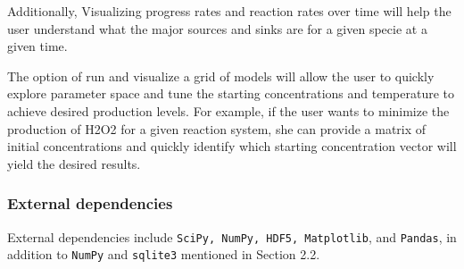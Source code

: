 \documentclass[12pt]{article}
\begin{document}
Additionally, Visualizing progress rates and reaction rates over time will help the user understand what the major sources and sinks are for a given specie at a given time. 

The option of run and visualize a grid of models will allow the user to quickly explore parameter space and tune the starting concentrations and temperature to achieve desired production levels. For example, if the user wants to minimize the production of H2O2 for a given reaction system, she can provide a matrix of initial concentrations and quickly identify which starting concentration vector will yield the desired results. 

\subsubsection{External dependencies}
External dependencies include \texttt{SciPy, NumPy, HDF5, Matplotlib}, and \texttt{Pandas}, in addition to \texttt{NumPy} and \texttt{sqlite3} mentioned in Section 2.2. 
\end{document}
